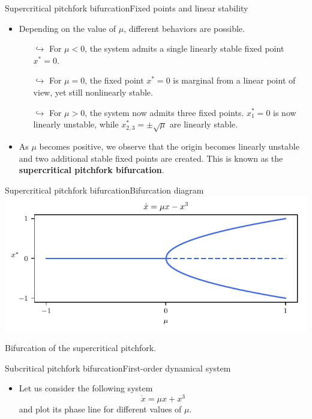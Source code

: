 \documentclass[usenames,dvipsnames,svgnames,10pt,aspectratio=169]{beamer}
\begin{document}
\begin{frame}[t, c]{Supercritical pitchfork bifurcation}{Fixed points and linear stability}
	\begin{itemize}
		\item Depending on the value of $\mu$, different behaviors are possible.
		\begin{itemize}
			\item[$\hookrightarrow$] For $\mu<0$, the system admits a single linearly stable fixed point $x^* = 0$.
			\item[$\hookrightarrow$] For $\mu = 0$, the fixed point $x^*=0$ is marginal from a linear point of view, yet still nonlinearly stable.
			\item[$\hookrightarrow$] For $\mu > 0$, the system now admits three fixed points. $x_1^*=0$ is now linearly unstable, while $x^*_{2, 3} = \pm \sqrt{\mu}$ are linearly stable.
		\end{itemize}

		\medskip

		\item As $\mu$ becomes positive, we observe that the origin becomes linearly unstable and two additional stable fixed points are created. This is known as the \alert{\textbf{supercritical pitchfork bifurcation}}.
	\end{itemize}

	\vspace{1cm}
\end{frame}

\begin{frame}[t, c]{Supercritical pitchfork bifurcation}{Bifurcation diagram}
	\centering
	\includegraphics[width=.75\textwidth]{supercritical_pitchfork_bifurcation_diagram}

	Bifurcation of the supercritical pitchfork.

	\vspace{1cm}
\end{frame}


\begin{frame}[t, c]{Subcritical pitchfork bifurcation}{First-order dynamical system}
	\begin{itemize}
		\item Let us consider the following system
		$$\dot{x} = \mu x + x^3$$
		and plot its phase line for different values of $\mu$.
	\end{itemize}

	\vspace{1cm}
\end{frame}
\end{document}

